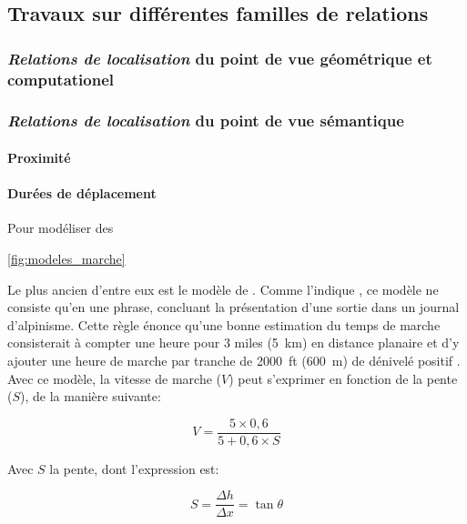 \subsection{Travaux sur différentes familles de relations}

\subsubsection{\emph{Relations de localisation} du point de vue géométrique et
  computationel}

\subsubsection{\emph{Relations de localisation} du point de vue sémantique}

\paragraph{Proximité}

\paragraph{Durées de déplacement}


Pour modéliser des

\autoref{fig:modeles_marche}

Le plus ancien d'entre eux est le modèle de
\textcite{Naismith1892}. Comme l'indique \textcite{Duchene2019}, ce
modèle ne consiste qu'en une phrase, concluant la présentation d'une
sortie dans un journal d'alpinisme. Cette règle énonce qu'une bonne
estimation du temps de marche consisterait à compter une heure pour 3
miles (\SI{5}{\kilo\meter}) en distance planaire et d'y ajouter une
heure de marche par tranche de \SI{2000}{ft} (\SI{600}{\meter}) de
dénivelé positif \autocite{Naismith1892}. Avec ce modèle, la vitesse
de marche (\(V\)) peut s'exprimer en fonction de la pente (\(S\)), de
la manière suivante:

\begin{equation}
  \label{eq:marche_naismith}
  V = \dfrac{5 × 0,6}{5 + 0,6 × S}
\end{equation}

Avec \(S\) la pente, dont l'expression est:

\begin{equation}
 S = \dfrac{Δh}{Δx} = \tan θ
\end{equation}

